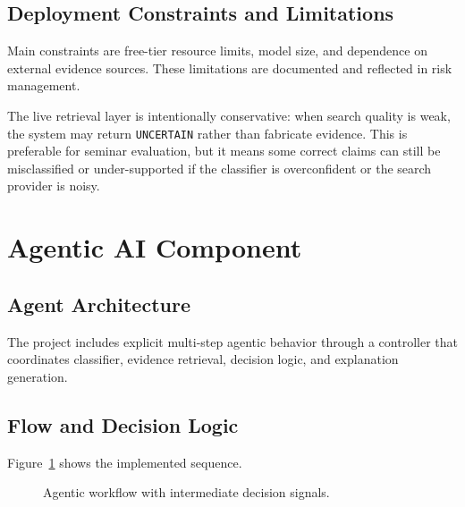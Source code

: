 \documentclass[11pt,a4paper]{article}
\begin{document}
\subsection{Deployment Constraints and Limitations}
Main constraints are free-tier resource limits, model size, and dependence on external evidence sources. These limitations are documented and reflected in risk management.

The live retrieval layer is intentionally conservative: when search quality is weak, the system may return \texttt{UNCERTAIN} rather than fabricate evidence. This is preferable for seminar evaluation, but it means some correct claims can still be misclassified or under-supported if the classifier is overconfident or the search provider is noisy.

\section{Agentic AI Component}
\subsection{Agent Architecture}
The project includes explicit multi-step agentic behavior through a controller that coordinates classifier, evidence retrieval, decision logic, and explanation generation.

\subsection{Flow and Decision Logic}
Figure~\ref{fig:agent-flow} shows the implemented sequence.

\begin{figure}[H]
\centering
{}
\caption{Agentic workflow with intermediate decision signals.}
\label{fig:agent-flow}
\end{figure}
\end{document}
